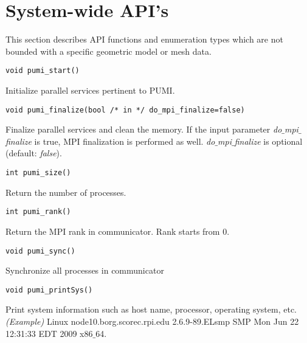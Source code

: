 \section{System-wide API's}

This section describes API functions and enumeration types which are not bounded with a specific geometric model or mesh data.

\begin{verbatim}
void pumi_start()		
\end{verbatim}
\vspace{-.5cm}\hspace{1cm}
	Initialize parallel services pertinent to PUMI.

\begin{verbatim}	
void pumi_finalize(bool /* in */ do_mpi_finalize=false)		
\end{verbatim}\vspace{-.5cm}\hspace{1cm}
	Finalize parallel services and clean the memory. If the input parameter \emph{do}$\_$\emph{mpi}$\_$\emph{finalize} is true, MPI finalization is performed as well. \emph{do}$\_$\emph{mpi}$\_$\emph{finalize} is optional (default: \emph{false}).

\begin{verbatim}
int pumi_size()
\end{verbatim}\vspace{-.5cm}\hspace{1cm}
	Return the number of processes.

\begin{verbatim}
int pumi_rank()
\end{verbatim}	
\vspace{-.5cm}\hspace{1cm}
	Return the MPI rank in communicator. Rank starts from 0. 

\begin{verbatim}
void pumi_sync()
\end{verbatim}\vspace{-.5cm}\hspace{1cm}
	Synchronize all processes in communicator

\begin{verbatim}
void pumi_printSys()
\end{verbatim}\vspace{-.5cm}\hspace{1cm}
	Print system information such as host name, processor, operating system, etc.\\
\emph{(Example)} Linux node10.borg.scorec.rpi.edu 2.6.9-89.ELsmp SMP Mon Jun 22 12:31:33 EDT 2009 x86$\_$64.

